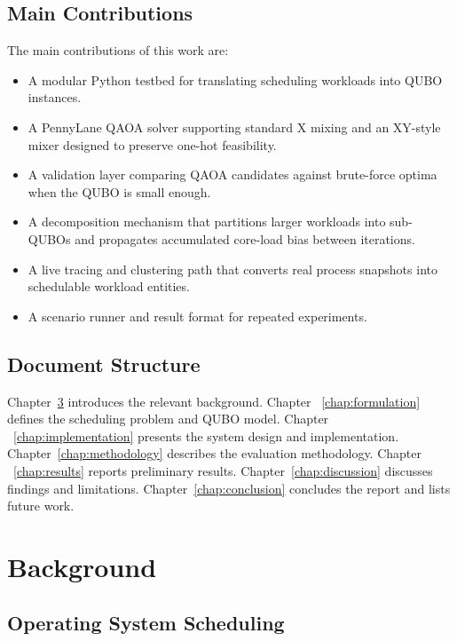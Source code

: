 \documentclass[12pt,a4paper,oneside]{report}
\begin{document}
\section{Main Contributions}

The main contributions of this work are:

\begin{itemize}
  \item A modular Python testbed for translating scheduling workloads into QUBO
  instances.
  \item A PennyLane QAOA solver supporting standard X mixing and an
  XY-style mixer designed to preserve one-hot feasibility.
  \item A validation layer comparing QAOA candidates against brute-force
  optima when the QUBO is small enough.
  \item A decomposition mechanism that partitions larger workloads into
  sub-QUBOs and propagates accumulated core-load bias between iterations.
  \item A live tracing and clustering path that converts real process snapshots
  into schedulable workload entities.
  \item A scenario runner and result format for repeated experiments.
\end{itemize}

\section{Document Structure}

Chapter~\ref{chap:background} introduces the relevant background. Chapter
~\ref{chap:formulation} defines the scheduling problem and QUBO model. Chapter
~\ref{chap:implementation} presents the system design and implementation.
Chapter~\ref{chap:methodology} describes the evaluation methodology. Chapter
~\ref{chap:results} reports preliminary results. Chapter~\ref{chap:discussion}
discusses findings and limitations. Chapter~\ref{chap:conclusion} concludes the
report and lists future work.

\chapter{Background}
\label{chap:background}

\section{Operating System Scheduling}
\end{document}
